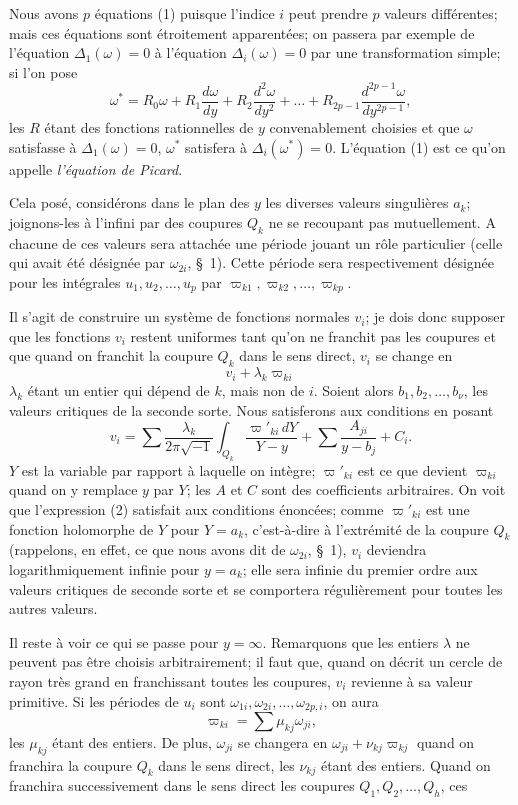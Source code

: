 \documentclass{article}
\begin{document}
Nous avons $p$ équations (1) puisque l'indice $i$ peut prendre $p$ valeurs différentes; mais ces équations sont étroitement apparentées; on passera par exemple de l'équation $\Delta_{1}(\omega) = 0$ à l'équation $\Delta_{i}(\omega) = 0$ par une transformation simple; si l'on pose
\[
\omega^{*} = R_{0}\omega + R_{1}\frac{d\omega}{dy} + R_{2}\frac{d^{2}\omega}{dy^{2}} + \ldots + R_{2p-1}\frac{d^{2p-1}\omega}{dy^{2p-1}},
\]
les $R$ étant des fonctions rationnelles de $y$ convenablement choisies et que $\omega$
satisfasse à $\Delta_{1}(\omega) = 0$, $\omega^{*}$ satisfera à $\Delta_{i}(\omega^{*}) = 0$. L'équation (1) est ce qu'on appelle \emph{l'équation de Picard}.

Cela posé, considérons dans le plan des $y$ les diverses valeurs singulières $a_{k}$; joignons-les à l'infini par des coupures $Q_{k}$ ne se recoupant pas mutuellement. A chacune de ces valeurs sera attachée une période jouant un rôle particulier (celle qui avait été désignée par $\omega_{2i}$, §~1). Cette période sera respectivement désignée pour les intégrales $u_{1}, u_{2}, \ldots, u_{p}$ par $\varpi_{k1}, \varpi_{k2}, \ldots, \varpi_{kp}$.

Il s'agit de construire un système de fonctions normales $v_{i}$; je dois donc supposer que les fonctions $v_{i}$ restent uniformes tant qu'on ne franchit pas les coupures et que quand on franchit la coupure $Q_{k}$ dans le sens direct, $v_{i}$ se change en
\[
v_{i} + \lambda_{k} \varpi_{ki}
\]
$\lambda_{k}$ étant un entier qui dépend de $k$, mais non de $i$. Soient alors $b_{1}, b_{2}, \ldots, b_{\nu}$, les valeurs critiques de la seconde sorte. Nous satisferons aux conditions en posant
\[
v_{i} = \sum \frac{\lambda_{k}}{2\pi\sqrt{-1}} \int_{Q_{k}} \frac{\varpi'_{ki}\,dY}{Y - y} + \sum \frac{A_{ji}}{y - b_{j}} + C_{i}. \tag{2}
\]
$Y$ est la variable par rapport à laquelle on intègre; $\varpi'_{ki}$ est ce que devient $\varpi_{ki}$ quand on y remplace $y$ par $Y$; les $A$ et $C$ sont des coefficients arbitraires. On voit que l'expression (2) satisfait aux conditions énoncées; comme $\varpi'_{ki}$ est une fonction holomorphe de $Y$ pour $Y = a_{k}$, c'est-à-dire à l'extrémité de la coupure $Q_{k}$ (rappelons, en effet, ce que nous avons dit de $\omega_{2i}$, §~1), $v_{i}$ deviendra logarithmiquement infinie pour $y = a_{k}$; elle sera infinie du premier ordre aux valeurs critiques de seconde sorte et se comportera régulièrement pour toutes les autres valeurs.

Il reste à voir ce qui se passe pour $y = \infty$. Remarquons que les entiers $\lambda$ ne peuvent pas être choisis arbitrairement; il faut que, quand on décrit un cercle de rayon très grand en franchissant toutes les coupures, $v_{i}$ revienne à sa valeur primitive. Si les périodes de $u_{i}$ sont $\omega_{1i}, \omega_{2i}, \ldots, \omega_{2p,i}$, on aura
\[
\varpi_{ki} = \sum \mu_{kj} \omega_{ji},
\]
les $\mu_{kj}$ étant des entiers. De plus, $\omega_{ji}$ se changera en $\omega_{ji} + \nu_{kj} \varpi_{kj}$ quand on franchira la coupure $Q_{k}$ dans le sens direct, les $\nu_{kj}$ étant des entiers. Quand on franchira successivement dans le sens direct les coupures $Q_{1}, Q_{2}, \ldots, Q_{h}$, ces
\end{document}

